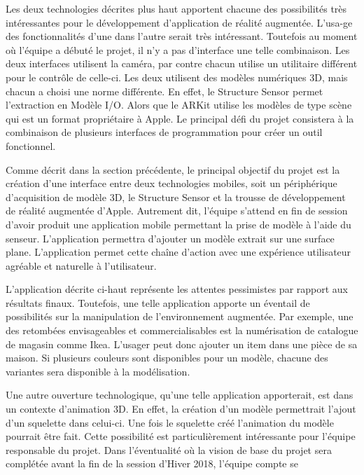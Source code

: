 \documentclass[letterpaper,twoside,12pt,french]{report}
\begin{document}
\par
Les deux technologies décrites plus haut apportent chacune des possibilités très intéressantes pour
le développement d'application de réalité augmentée. L'usa\hyp{}ge des fonctionnalités d'une dans l'autre
serait très intéressant. Toutefois au moment où l'équipe a débuté le projet, il n'y a pas
d'interface une telle combinaison. Les deux interfaces utilisent la caméra, par contre chacun
utilise un utilitaire différent pour le contrôle de celle-ci. Les deux utilisent des modèles
numériques 3D, mais chacun a choisi une norme différente. En effet, le Structure Sensor permet
l'extraction en Modèle I/O. Alors que le ARKit utilise les modèles de type scène qui est un format
propriétaire à Apple. Le principal défi du projet consistera à la combinaison de plusieurs
interfaces de programmation pour créer un outil fonctionnel.
\par
Comme décrit dans la section précédente, le principal objectif du projet est la création d'une
interface entre deux technologies mobiles, soit un périphérique d'acquisition de modèle 3D, le
Structure Sensor et la trousse de développement de réalité augmentée d'Apple. Autrement dit,
l'équipe s'attend en fin de session d'avoir produit une application mobile permettant la prise
de modèle à l'aide du senseur. L'application permettra d'ajouter un modèle extrait sur une surface
plane. L'application permet cette chaîne d'action avec une expérience utilisateur agréable et
naturelle à l'utilisateur.
\par
L'application décrite ci-haut représente les attentes pessimistes par rapport aux résultats finaux.
Toutefois, une telle application apporte un éventail de possibilités sur la manipulation de
l'environnement augmentée. Par exemple, une des retombées envisageables et
commercialisables est la numérisation de catalogue de magasin comme Ikea. L'usager peut
donc ajouter un item dans une pièce de sa maison. Si plusieurs couleurs sont disponibles pour
un modèle, chacune des variantes sera disponible à la modélisation.
\par
Une autre ouverture technologique, qu'une telle application apporterait, est dans un contexte
d'animation 3D. En effet, la création d'un modèle permettrait l'ajout d'un squelette dans celui-ci.
Une fois le squelette créé l'animation du modèle pourrait être fait. Cette possibilité est
particulièrement intéressante pour l'équipe responsable du projet. Dans l'éventualité où la vision
de base du projet sera complétée avant la fin de la session d'Hiver 2018, l'équipe compte se
\end{document}
